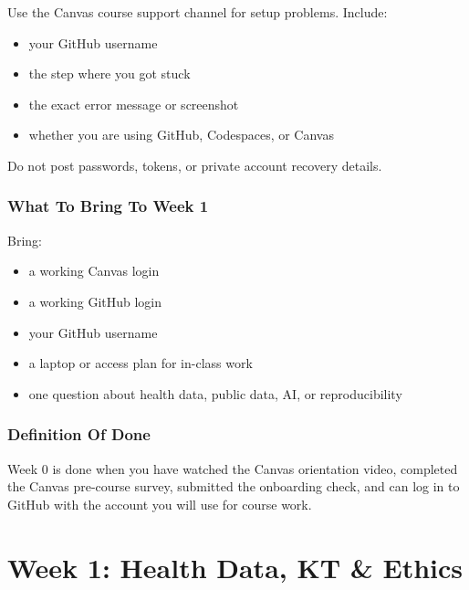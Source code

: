\documentclass[
  letterpaper,
  DIV=11,
  numbers=noendperiod,
  oneside]{scrreprt}
\providecommand{\tightlist}{%
  \setlength{\itemsep}{0pt}\setlength{\parskip}{0pt}}
\begin{document}

Use the Canvas course support channel for setup problems. Include:

\begin{itemize}
\tightlist
\item
  your GitHub username
\item
  the step where you got stuck
\item
  the exact error message or screenshot
\item
  whether you are using GitHub, Codespaces, or Canvas
\end{itemize}

Do not post passwords, tokens, or private account recovery details.

\section*{What To Bring To Week 1}\label{what-to-bring-to-week-1}


Bring:

\begin{itemize}
\tightlist
\item
  a working Canvas login
\item
  a working GitHub login
\item
  your GitHub username
\item
  a laptop or access plan for in-class work
\item
  one question about health data, public data, AI, or reproducibility
\end{itemize}

\section*{Definition Of Done}\label{definition-of-done}


Week 0 is done when you have watched the Canvas orientation video,
completed the Canvas pre-course survey, submitted the onboarding check,
and can log in to GitHub with the account you will use for course work.

\part{Week 1: Health Data, KT \& Ethics}
\end{document}
